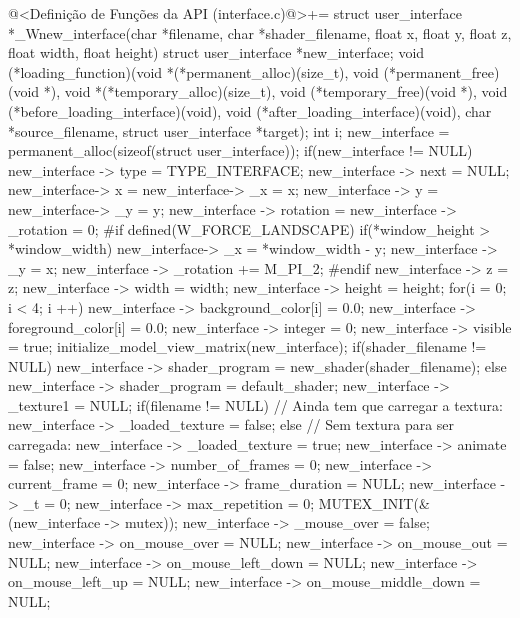 \iniciocodigo
@<Definição de Funções da API (interface.c)@>+=
struct user_interface *_Wnew_interface(char *filename, char *shader_filename,
                                  float x, float y, float z, float width,
                                  float height){
  struct user_interface *new_interface;
  void (*loading_function)(void *(*permanent_alloc)(size_t),
                           void (*permanent_free)(void *),
                           void *(*temporary_alloc)(size_t),
                           void (*temporary_free)(void *),
                           void (*before_loading_interface)(void),
                           void (*after_loading_interface)(void),
                           char *source_filename, struct user_interface *target);
  int i;
  new_interface = permanent_alloc(sizeof(struct user_interface));
  if(new_interface != NULL){
    new_interface -> type = TYPE_INTERFACE;
    new_interface -> next = NULL;
    new_interface-> x = new_interface-> _x = x;
    new_interface -> y = new_interface-> _y = y;
    new_interface -> rotation = new_interface -> _rotation = 0;
#if defined(W_FORCE_LANDSCAPE)
   if(*window_height > *window_width){
      new_interface-> _x = *window_width - y;
      new_interface -> _y = x;
      new_interface -> _rotation += M_PI_2;
   }
#endif
    new_interface -> z = z;
    new_interface -> width = width;
    new_interface -> height = height;
    for(i = 0; i < 4; i ++){
      new_interface -> background_color[i] = 0.0;
      new_interface -> foreground_color[i] = 0.0;
    }
    new_interface -> integer = 0;
    new_interface -> visible = true;
    initialize_model_view_matrix(new_interface);
    if(shader_filename != NULL)
      new_interface -> shader_program = new_shader(shader_filename);
    else
      new_interface -> shader_program = default_shader;
    new_interface -> _texture1 = NULL;
    if(filename != NULL) // Ainda tem que carregar a textura:
      new_interface -> _loaded_texture = false;
    else // Sem textura para ser carregada:
      new_interface -> _loaded_texture = true;
    new_interface -> animate = false;
    new_interface -> number_of_frames = 0;
    new_interface -> current_frame = 0;
    new_interface -> frame_duration = NULL;
    new_interface -> _t = 0;
    new_interface -> max_repetition = 0;
    MUTEX_INIT(&(new_interface -> mutex));
    new_interface -> _mouse_over = false;
    new_interface -> on_mouse_over = NULL;
    new_interface -> on_mouse_out = NULL;
    new_interface -> on_mouse_left_down = NULL;
    new_interface -> on_mouse_left_up = NULL;
    new_interface -> on_mouse_middle_down = NULL;
}}
